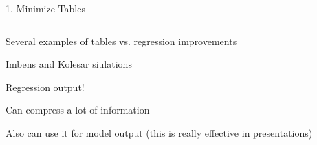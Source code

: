\documentclass[notes,11pt, aspectratio=169]{beamer}
\newcommand\1{\operatorname{\mathbbm{1}}\indicatorfence}
\newenvironment{wideitemize}{\itemize\addtolength{\itemsep}{10pt}}{\enditemize}
\begin{document}
\begin{frame}{1. Minimize Tables}
  \begin{columns}[T] %
    \begin{column}{.5\textwidth}
      \begin{wideitemize}
      \item<1-> Several examples of tables vs. regression improvements
      \item<1-> Imbens and Kolesar siulations
      \item<2-> Regression output!
      \item<3-> Can compress a lot of information
      \item<4-> Also can use it for model output  (this is really effective in presentations)
      \end{wideitemize}
  \end{column}%
  \hfill%
  \begin{column}{.5\textwidth}
  \end{column}
\end{columns}
\end{frame}
\end{document}
